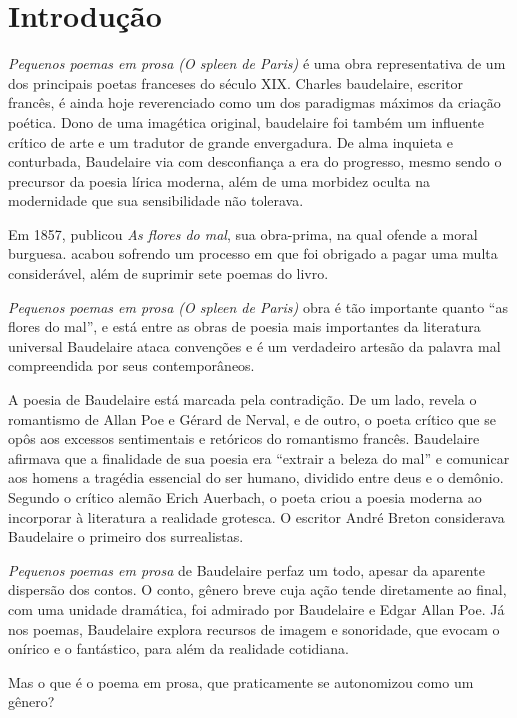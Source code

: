 \documentclass[12pt]{extarticle}
\begin{document}
\tableofcontents

\section{Introdução}

\textit{Pequenos poemas em prosa (O spleen de Paris)}
é uma obra representativa de um dos principais poetas franceses do
século XIX. Charles baudelaire, escritor francês, é ainda hoje reverenciado como um dos
paradigmas máximos da criação poética. Dono de uma imagética original,
baudelaire foi também um influente crítico de
arte e um tradutor de grande envergadura. De alma inquieta e conturbada, 
Baudelaire via com desconfiança a era do
progresso, mesmo sendo o precursor da poesia lírica moderna, 
além de uma morbidez oculta na modernidade que sua sensibilidade não tolerava.
 
Em 1857, publicou \textit{As flores do mal}, sua
obra-prima, na qual ofende a moral burguesa. acabou sofrendo um processo em
que foi obrigado a pagar uma multa considerável, além de suprimir sete poemas
do livro. 

\textit{Pequenos poemas em prosa (O spleen de Paris)} 
obra é tão importante quanto “as flores do mal”, e está
entre as obras de poesia mais importantes da literatura universal
Baudelaire ataca convenções e é um verdadeiro artesão da palavra mal
compreendida por seus contemporâneos. 

A poesia de Baudelaire está marcada pela
contradição. De um lado, revela o romantismo de Allan Poe e Gérard de Nerval, e
de outro, o poeta crítico que se opôs aos excessos sentimentais e retóricos do
romantismo francês.
Baudelaire afirmava que a finalidade de sua poesia era “extrair a beleza do
mal” e comunicar aos homens a tragédia essencial do ser humano, dividido entre
deus e o demônio.  Segundo o crítico alemão Erich Auerbach, o poeta criou a
poesia moderna ao incorporar à literatura a realidade grotesca. O escritor
André Breton considerava Baudelaire o primeiro dos surrealistas.
 
\textit{Pequenos poemas em prosa} de Baudelaire perfaz um todo, 
apesar da aparente dispersão dos contos. O conto, gênero breve cuja 
ação tende diretamente ao final, com uma unidade
dramática, foi admirado por Baudelaire e Edgar Allan Poe.
Já nos poemas, Baudelaire explora recursos de imagem e sonoridade, que evocam o
onírico e o fantástico, para além da realidade cotidiana.

Mas o que é o poema em prosa, que praticamente se autonomizou como um
gênero?
 
\end{document}
